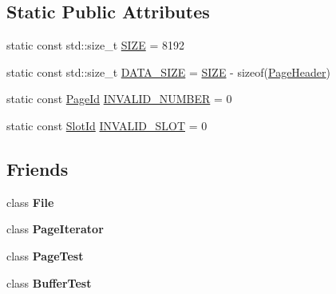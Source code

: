 \subsection*{Static Public Attributes}
\begin{DoxyCompactItemize}
\item 
static const std\-::size\-\_\-t \hyperlink{classbadgerdb_1_1Page_ae92d52803502854f97309bae2c14ea55}{S\-I\-Z\-E} = 8192
\item 
static const std\-::size\-\_\-t \hyperlink{classbadgerdb_1_1Page_a74057ec71412352ef0aa5913bbebed25}{D\-A\-T\-A\-\_\-\-S\-I\-Z\-E} = \hyperlink{classbadgerdb_1_1Page_ae92d52803502854f97309bae2c14ea55}{S\-I\-Z\-E} -\/ sizeof(\hyperlink{structbadgerdb_1_1PageHeader}{Page\-Header})
\item 
static const \hyperlink{namespacebadgerdb_a1f49e404293bf4240756b89b53b1587a}{Page\-Id} \hyperlink{classbadgerdb_1_1Page_a785a1e756d47fb7f8f3603a3fe8ffcef}{I\-N\-V\-A\-L\-I\-D\-\_\-\-N\-U\-M\-B\-E\-R} = 0
\item 
static const \hyperlink{namespacebadgerdb_afe9f2f985e7c67e04f76a16f7c4500c8}{Slot\-Id} \hyperlink{classbadgerdb_1_1Page_a4013fab43df72bc52931241575736353}{I\-N\-V\-A\-L\-I\-D\-\_\-\-S\-L\-O\-T} = 0
\end{DoxyCompactItemize}
\subsection*{Friends}
\begin{DoxyCompactItemize}
\item 
\hypertarget{classbadgerdb_1_1Page_a68d15876ad188b7628261b12d0eac8aa}{class {\bfseries File}}\label{classbadgerdb_1_1Page_a68d15876ad188b7628261b12d0eac8aa}

\item 
\hypertarget{classbadgerdb_1_1Page_ae93be65f49fbfeb5716a90719b8c4cb7}{class {\bfseries Page\-Iterator}}\label{classbadgerdb_1_1Page_ae93be65f49fbfeb5716a90719b8c4cb7}

\item 
\hypertarget{classbadgerdb_1_1Page_a724e730c198a7a3d941f08f9653f8154}{class {\bfseries Page\-Test}}\label{classbadgerdb_1_1Page_a724e730c198a7a3d941f08f9653f8154}

\item 
\hypertarget{classbadgerdb_1_1Page_aaf5d48a87d5c9424661d35cc89243a13}{class {\bfseries Buffer\-Test}}\label{classbadgerdb_1_1Page_aaf5d48a87d5c9424661d35cc89243a13}

\end{DoxyCompactItemize}


